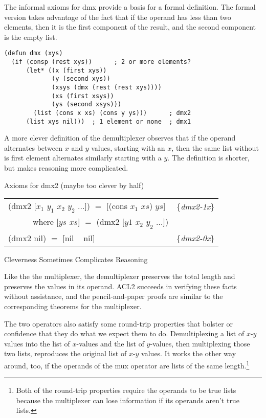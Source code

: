 The informal axioms for dmx provide a basis for a formal definition.
The formal version takes advantage of the fact that if the operand
has less than two elements, then it is the first component of the result,
and the second component is the empty list.

\label{dmx-defun}
\begin{Verbatim}
(defun dmx (xys)
  (if (consp (rest xys))      ; 2 or more elements?
      (let* ((x (first xys))
             (y (second xys))
             (xsys (dmx (rest (rest xys))))
             (xs (first xsys))
             (ys (second xsys)))
        (list (cons x xs) (cons y ys)))      ; dmx2
      (list xys nil)))  ; 1 element or none  ; dmx1
\end{Verbatim}

\begin{aside}
A more clever definition of the demultiplexer
observes that if the operand alternates between $x$ and $y$ values,
starting with an $x$,
then the same list without is first element alternates similarly
starting with a $y$. The definition is shorter,
but makes reasoning more complicated.\\
\begin{center}
Axioms for dmx2 (maybe too clever by half)
\begin{tabular}{ll}
(dmx2 [$x_1$ $y_1$ $x_2$ $y_2$ $\dots$]) $=$ [(cons $x_1$ $xs$) $ys$]  & \{\emph{dmx2-1x}\} \\
~~~~~~where [$ys$ $xs$] $=$ (dmx2 [$y1$ $x_2$ $y_2$ $\dots$])          & \\
(dmx2 nil) $=$ [nil ~ nil]                                             & \{\emph{dmx2-0x}\} \\
\end{tabular}
\end{center}
\caption{Cleverness Sometimes Complicates Reasoning}
\label{aside:dmx-defun-trick}
\end{aside}

Like the the multiplexer,
the demultiplexer preserves the total length
and preserves the values in its operand.
ACL2 succeeds in verifying these facts without assistance,
and the pencil-and-paper proofs are similar to the corresponding
theorems for the multiplexer.

The two operators also satisfy some round-trip properties
that bolster or confidence that they do what we expect them to do.
Demultiplexing a list of $x$-$y$ values into the list of
$x$-values and the list of $y$-values, then multiplexing
those two lists, reproduces the original list of $x$-$y$ values.
It works the other way around, too, if the operands of
the mux operator are lists of the same length.\footnote{Both
of the round-trip properties require the operands to be
true lists because the multiplexer can lose information
if its operands aren't true lists.}


